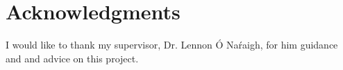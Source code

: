 \chapter*{Acknowledgments} \label{sec:acknowledgments}

I would like to thank my supervisor, Dr. Lennon \'O Na\'raigh, for him guidance and
and advice on this project. 